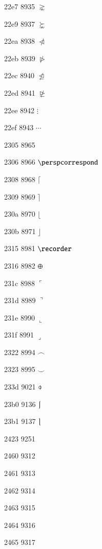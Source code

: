 \documentclass[11pt]{article}
\begin{document}
22e7 8935 \ensuremath{\gnsim}


22e9 8937 \ensuremath{\succnsim}

22ea 8938 \ensuremath{\ntriangleleft}

22eb 8939 \ensuremath{\ntriangleright}

22ec 8940 \ensuremath{\ntrianglelefteq}

22ed 8941 \ensuremath{\ntrianglerighteq}

22ee 8942 \ensuremath{\vdots}

22ef 8943 \ensuremath{\cdots}



2305 8965 \barwedge

2306 8966 \ensuremath{\perspcorrespond}

2308 8968 \ensuremath{\lceil}

2309 8969 \ensuremath{\rceil}

230a 8970 \ensuremath{\lfloor}

230b 8971 \ensuremath{\rfloor}

2315 8981 \ensuremath{\recorder}

2316 8982 \ensuremath{\mathchar"2208}

231c 8988 \ensuremath{\ulcorner}

231d 8989 \ensuremath{\urcorner}

231e 8990 \ensuremath{\llcorner}

231f 8991 \ensuremath{\lrcorner}

2322 8994 \ensuremath{\frown}

2323 8995 \ensuremath{\smile}

233d 9021 \ensuremath{\obar}


23b0 9136 \ensuremath{\lmoustache}

23b1 9137 \ensuremath{\rmoustache}

2423 9251 \textvisiblespace

2460 9312 

2461 9313 

2462 9314 

2463 9315 

2464 9316 

2465 9317 
\end{document}
